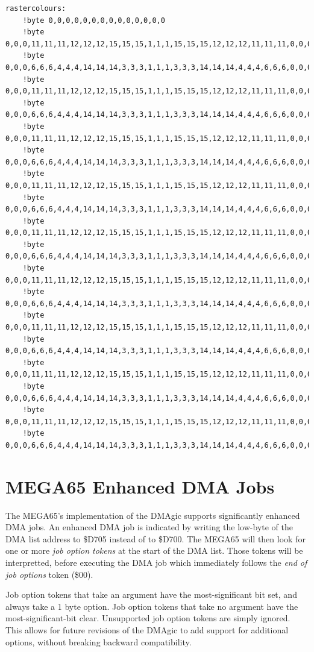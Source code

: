 \begin{tcolorbox}[colback=black,coltext=white]
\verbatimfont{\codefont}
\begin{verbatim}
rastercolours:
	!byte 0,0,0,0,0,0,0,0,0,0,0,0,0,0
	!byte 0,0,0,11,11,11,12,12,12,15,15,15,1,1,1,15,15,15,12,12,12,11,11,11,0,0,0
	!byte 0,0,0,6,6,6,4,4,4,14,14,14,3,3,3,1,1,1,3,3,3,14,14,14,4,4,4,6,6,6,0,0,0
	!byte 0,0,0,11,11,11,12,12,12,15,15,15,1,1,1,15,15,15,12,12,12,11,11,11,0,0,0
	!byte 0,0,0,6,6,6,4,4,4,14,14,14,3,3,3,1,1,1,3,3,3,14,14,14,4,4,4,6,6,6,0,0,0
	!byte 0,0,0,11,11,11,12,12,12,15,15,15,1,1,1,15,15,15,12,12,12,11,11,11,0,0,0
	!byte 0,0,0,6,6,6,4,4,4,14,14,14,3,3,3,1,1,1,3,3,3,14,14,14,4,4,4,6,6,6,0,0,0
	!byte 0,0,0,11,11,11,12,12,12,15,15,15,1,1,1,15,15,15,12,12,12,11,11,11,0,0,0
	!byte 0,0,0,6,6,6,4,4,4,14,14,14,3,3,3,1,1,1,3,3,3,14,14,14,4,4,4,6,6,6,0,0,0
	!byte 0,0,0,11,11,11,12,12,12,15,15,15,1,1,1,15,15,15,12,12,12,11,11,11,0,0,0
	!byte 0,0,0,6,6,6,4,4,4,14,14,14,3,3,3,1,1,1,3,3,3,14,14,14,4,4,4,6,6,6,0,0,0
	!byte 0,0,0,11,11,11,12,12,12,15,15,15,1,1,1,15,15,15,12,12,12,11,11,11,0,0,0
	!byte 0,0,0,6,6,6,4,4,4,14,14,14,3,3,3,1,1,1,3,3,3,14,14,14,4,4,4,6,6,6,0,0,0
	!byte 0,0,0,11,11,11,12,12,12,15,15,15,1,1,1,15,15,15,12,12,12,11,11,11,0,0,0
	!byte 0,0,0,6,6,6,4,4,4,14,14,14,3,3,3,1,1,1,3,3,3,14,14,14,4,4,4,6,6,6,0,0,0
	!byte 0,0,0,11,11,11,12,12,12,15,15,15,1,1,1,15,15,15,12,12,12,11,11,11,0,0,0
	!byte 0,0,0,6,6,6,4,4,4,14,14,14,3,3,3,1,1,1,3,3,3,14,14,14,4,4,4,6,6,6,0,0,0
	!byte 0,0,0,11,11,11,12,12,12,15,15,15,1,1,1,15,15,15,12,12,12,11,11,11,0,0,0
	!byte 0,0,0,6,6,6,4,4,4,14,14,14,3,3,3,1,1,1,3,3,3,14,14,14,4,4,4,6,6,6,0,0,0
\end{verbatim}
\end{tcolorbox}

\section{MEGA65 Enhanced DMA Jobs}

The MEGA65's implementation of the DMAgic supports significantly
enhanced DMA jobs.  An enhanced DMA job is indicated by writing the
low-byte of the DMA list address to \$D705 instead of to \$D700.  The
MEGA65 will then look for one or more {\em job option tokens} at the
start of the DMA list.  Those tokens will be interpretted, before
executing the DMA job which immediately follows the {\em end of job
  options} token (\$00).

Job option tokens that take an argument have the
most-significant bit set, and always take a 1 byte option.  Job option
tokens that take no argument have the most-significant-bit clear.
Unsupported job option tokens are simply ignored.
This allows for future revisions of the DMAgic to add support for
additional options, without breaking backward compatibility.

